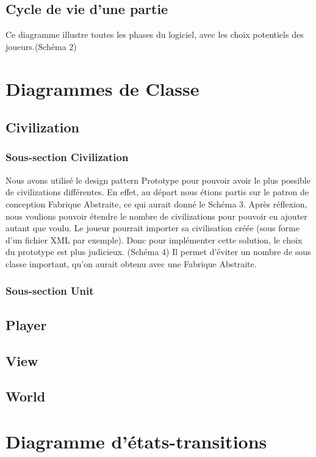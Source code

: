 	\subsection{Cycle de vie d'une partie}
	Ce diagramme illustre toutes les phases du logiciel, avec les choix potentiels des joueurs.(Schéma 2)
	
\section{Diagrammes de Classe}
	\subsection{Civilization}
		\subsubsection{Sous-section Civilization}
			Nous avons utilisé le design pattern Prototype pour pouvoir avoir le plus possible de civilizations différentes.
		En effet, au départ nous étions partis sur le patron de conception Fabrique Abstraite, ce qui aurait donné le Schéma 3.
			Après réflexion, nous voulions pouvoir étendre le nombre de civilizations pour pouvoir en ajouter autant que voulu.
		Le joueur pourrait importer sa civilisation créée (sous forme d'un fichier XML par exemple). 
		Donc pour implémenter cette solution, le choix du prototype est plus judicieux. (Schéma 4)
		Il permet d'éviter un nombre de sous classe important, qu'on aurait obtenu avec une Fabrique Abstraite.
		
		\subsubsection{Sous-section Unit}
		
		
	\subsection{Player}
	\subsection{View}
	\subsection{World}
	
	
\section{Diagramme d'états-transitions}

